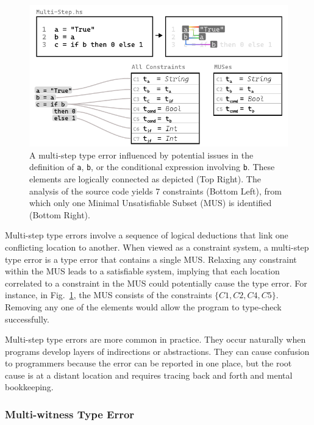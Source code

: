 \documentclass[pdflatex,lineno,sn-nature,Numbered]{sn-jnl}%
\begin{document}
\begin{figure}[hbt]
  \centering \includegraphics[width=\linewidth]{images/Multi-Step-MUS}
  \caption {A multi-step type error influenced by potential issues in the definition of \texttt{a}, \texttt{b}, or the conditional expression involving \texttt{b}. These elements are logically connected as depicted (Top Right). The analysis of the source code yields 7 constraints (Bottom Left), from which only one Minimal Unsatisfiable Subset (MUS) is identified (Bottom Right).
  }
  \label{fig:multi-step-2}
  \end{figure}

Multi-step type errors involve a sequence of logical deductions that link one conflicting location to another. When viewed as a constraint system, a multi-step type error is a type error that contains a single MUS. Relaxing any constraint within the MUS leads to a satisfiable system, implying that each location correlated to a constraint in the MUS could potentially cause the type error. For instance, in Fig.~\ref{fig:multi-step-2}, the MUS consists of the constraints $\{C1, C2, C4, C5\}$. Removing any one of the elements would allow the program to type-check successfully.

Multi-step type errors are more common in practice. They occur naturally when programs develop layers of indirections or abstractions. They can cause confusion to programmers because the error can be reported in one place, but the root cause is at a distant location and requires tracing back and forth and mental bookkeeping. 


\subsubsection*{Multi-witness Type Error} 
\end{document}
